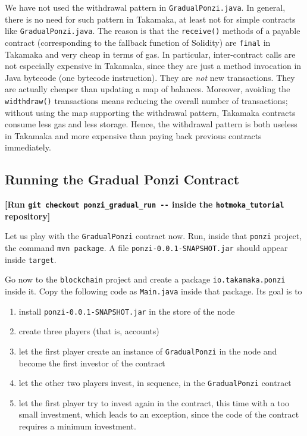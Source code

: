 \documentclass[a4paper,]{book}
\providecommand{\tightlist}{%
  \setlength{\itemsep}{0pt}\setlength{\parskip}{0pt}}
\begin{document}
{We have not used the withdrawal pattern in \texttt{GradualPonzi.java}.
In general, there is no need for such pattern in Takamaka, at least not
for simple contracts like \texttt{GradualPonzi.java}. The reason is that
the \texttt{receive()} methods of a payable contract (corresponding to
the fallback function of Solidity) are \texttt{final} in Takamaka and
very cheap in terms of gas. In particular, inter-contract calls are not
especially expensive in Takamaka, since they are just a method
invocation in Java bytecode (one bytecode instruction). They are
\emph{not} new transactions. They are actually cheaper than updating a
map of balances. Moreover, avoiding the \texttt{widthdraw()}
transactions means reducing the overall number of transactions; without
using the map supporting the withdrawal pattern, Takamaka contracts
consume less gas and less storage. Hence, the withdrawal pattern is both
useless in Takamaka and more expensive than paying back previous
contracts immediately.

\hypertarget{running-the-gradual-ponzi-contract}{%
\subsection{Running the Gradual Ponzi Contract
}\label{running-the-gradual-ponzi-contract}}

\textbf{{[}Run \texttt{git\ checkout\ ponzi\_gradual\_run\ -\/-} inside
the \texttt{hotmoka\_tutorial} repository{]}}

Let us play with the \texttt{GradualPonzi} contract now. Run, inside
that \texttt{ponzi} project, the command \texttt{mvn\ package}. A file
\texttt{ponzi-0.0.1-SNAPSHOT.jar} should appear inside \texttt{target}.

Go now to the \texttt{blockchain} project and create a package
\texttt{io.takamaka.ponzi} inside it. Copy the following code as
\texttt{Main.java} inside that package. Its goal is to

\begin{enumerate}
\def\labelenumi{\arabic{enumi}.}
\tightlist
\item
  install \texttt{ponzi-0.0.1-SNAPSHOT.jar} in the store of the node
\item
  create three players (that is, accounts)
\item
  let the first player create an instance of \texttt{GradualPonzi} in
  the node and become the first investor of the contract
\item
  let the other two players invest, in sequence, in the
  \texttt{GradualPonzi} contract
\item
  let the first player try to invest again in the contract, this time
  with a too small investment, which leads to an exception, since the
  code of the contract requires a minimum investment.
\end{enumerate}

}
\end{document}
